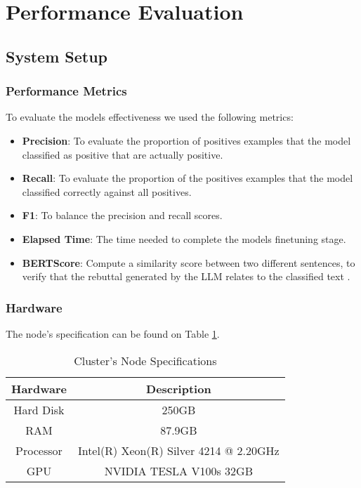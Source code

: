 \section{Performance Evaluation}
\subsection{System Setup}
\subsubsection{Performance Metrics}
To evaluate the models effectiveness we used the following metrics:

\begin{itemize}
	\item{\textbf{Precision}}: To evaluate the proportion of positives examples that the model classified as positive that are actually positive. 
	\item{\textbf{Recall}}: To evaluate the proportion of the positives examples that the model classified correctly against all positives.
	\item{\textbf{F1}}: To balance the precision and recall scores.
	\item{\textbf{Elapsed Time}}: The time needed to complete the models finetuning stage.
	\item{\textbf{BERTScore}}: Compute a similarity score between two different sentences, to verify that the rebuttal generated by the LLM relates to the classified text \cite{zhang2020bertscoreevaluatingtextgeneration}.
\end{itemize}

\subsubsection{Hardware}
The node's specification can be found on Table \ref{table:hardware}.
\begin{table}[ht!]
\centering
\caption{Cluster's Node Specifications}
{\footnotesize
\begin{tabular}{||c | c||} 
 \hline
\textbf{Hardware} & \textbf{Description} \\ 
 \hline
 Hard Disk & 250GB  \\ 
 \hline
 RAM & 87.9GB  \\ 
 \hline
 Processor & Intel(R) Xeon(R) Silver 4214 @ 2.20GHz \\ 
 \hline
 GPU & NVIDIA TESLA V100s 32GB \\
 \hline
\end{tabular}
}
\label{table:hardware}
\end{table}

